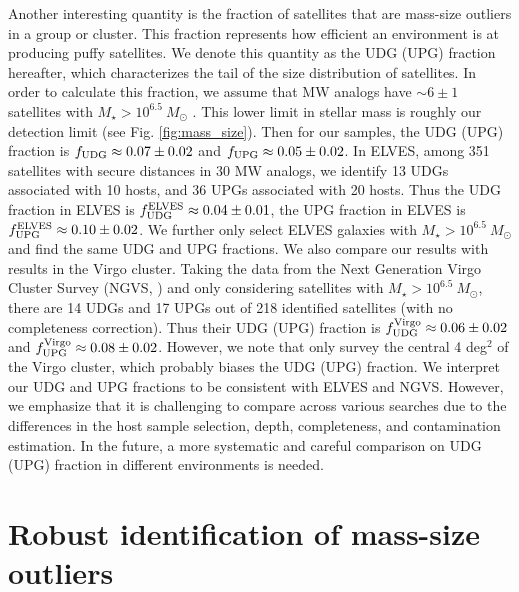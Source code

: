 \documentclass[twocolumn,astrosymb,twocolappendix]{aastex631}
\begin{document}
\begin{CJK*}{UTF8}{gbsn}
Another interesting quantity is the fraction of satellites that are mass-size outliers in a group or cluster. This fraction represents how efficient an environment is at producing puffy satellites. We denote this quantity as the UDG (UPG) fraction hereafter, which characterizes the tail of the size distribution of satellites. In order to calculate this fraction, we assume that MW analogs have $\sim 6 \pm 1$ satellites with $M_\star > 10^{6.5}\ M_\odot$ \citep{CarlstenELVES2022}. This lower limit in stellar mass is roughly our detection limit (see Fig. \ref{fig:mass_size}). Then for our samples, the UDG (UPG) fraction is $f_{\rm UDG} \approx 0.07 \pm 0.02$ and $f_{\rm UPG} \approx 0.05 \pm 0.02$. In ELVES, among 351 satellites with secure distances in 30 MW analogs, we identify 13 UDGs associated with 10 hosts, and 36 UPGs associated with 20 hosts. Thus the UDG fraction in ELVES is $f_{\rm UDG}^{\rm ELVES} \approx 0.04 \pm 0.01$, the UPG fraction in ELVES is $f_{\rm UPG}^{\rm ELVES} \approx 0.10 \pm 0.02$. We further only select ELVES galaxies with $M_\star > 10^{6.5}\ M_\odot$ and find the same UDG and UPG fractions. We also compare our results with results in the Virgo cluster. Taking the data from the Next Generation Virgo Cluster Survey (NGVS, \citealt{Ferrarese2020}) and only considering satellites with $M_\star > 10^{6.5}\ M_\odot$, there are 14 UDGs and 17 UPGs out of 218 identified satellites (with no completeness correction). Thus their UDG (UPG) fraction is $f_{\rm UDG}^{\rm Virgo} \approx 0.06\pm 0.02$ and $f_{\rm UPG}^{\rm Virgo} \approx 0.08\pm 0.02$. However, we note that \citet{Ferrarese2020} only survey the central 4 deg$^2$ of the Virgo cluster, which probably biases the UDG (UPG) fraction.
We interpret our UDG and UPG fractions to be consistent with ELVES and NGVS. However, we emphasize that it is challenging to compare across various searches due to the differences in the host sample selection, depth, completeness, and contamination estimation. In the future, a more systematic and careful comparison on UDG (UPG) fraction in different environments is needed. 


\section{Robust identification of mass-size outliers}\label{sec:discussion}


\end{CJK*}
\end{document}
